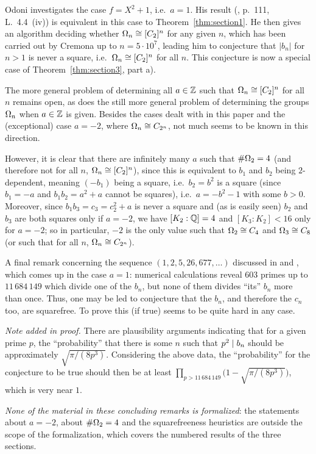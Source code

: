 Odoni \cite{odoni} investigates the case $f = X^2 + 1$, i.e.\ $a = 1$. His result
(\cite{odoni}, p.~111, L.~4.4~(iv)) is equivalent in this case to Theorem~\ref{thm:section1}. He
then gives an algorithm deciding whether $\Omega_n \cong [C_2]^{n}$ for any given $n$, which has been
carried out by Cremona \cite{cremona} up to $n = 5 \cdot 10^7$, leading him to conjecture that
$|b_n|$ for $n > 1$ is never a square, i.e.\ $\Omega_n \cong [C_2]^{n}$ for all $n$. This conjecture is
now a special case of Theorem~\ref{thm:section3}, part a).

The more general problem of determining all $a \in \mathbb{Z}$ such that $\Omega_n \cong [C_2]^{n}$ for all
$n$ remains open, as does the still more general problem of determining the groups $\Omega_n$ when
$a \in \mathbb{Z}$ is given. Besides the cases dealt with in this paper and the (exceptional) case
$a = -2$, where $\Omega_n \cong C_{2^n}$, not much seems to be known in this direction.

However, it is clear that there are infinitely many $a$ such that $\#\Omega_2 = 4$ (and therefore
not for all $n$, $\Omega_n \cong [C_2]^{n}$), since this is equivalent to $b_1$ and $b_2$ being
$2$-dependent, meaning $(-b_1)$ being a square, i.e.\ $b_2 = b^2$ is a square (since $b_1 = -a$
and $b_1 b_2 = a^2 + a$ cannot be squares), i.e.\ $a = -b^2 - 1$ with some $b > 0$. Moreover,
since $b_1 b_3 = c_3 = c_2^2 + a$ is never a square and (as is easily seen) $b_2$ and $b_3$ are
both squares only if $a = -2$, we have $[K_2 : \mathbb{Q}] = 4$ and $[K_3 : K_2] < 16$ only for
$a = -2$; so in particular, $-2$ is the only value such that $\Omega_2 \cong C_4$ and
$\Omega_3 \cong C_8$ (or such that for all $n$, $\Omega_n \cong C_{2^n}$).

A final remark concerning the sequence $(1, 2, 5, 26, 677, \dots)$ discussed in \cite{cremona}
and \cite{odoni}, which comes up in the case $a = 1$: numerical calculations reveal $603$ primes
up to $11\,684\,149$ which divide one of the $b_n$, but none of them divides ``its'' $b_n$ more
than once. Thus, one may be led to conjecture that the $b_n$, and therefore the $c_n$ too, are
squarefree. To prove this (if true) seems to be quite hard in any case.

\emph{Note added in proof.} There are plausibility arguments indicating that for a given prime
$p$, the ``probability'' that there is some $n$ such that $p^2 \mathrel{\mid} b_n$ should be approximately
$\sqrt{\pi/(8p^3)}$. Considering the above data, the ``probability'' for the conjecture to be
true should then be at least $\prod_{p > 11\,684\,149} \bigl(1 - \sqrt{\pi/(8p^3)}\bigr)$, which
is very near $1$.

\emph{None of the material in these concluding remarks is formalized}: the statements about
$a = -2$, about $\#\Omega_2 = 4$ and the squarefreeness heuristics are outside the scope of the
formalization, which covers the numbered results of the three sections.
